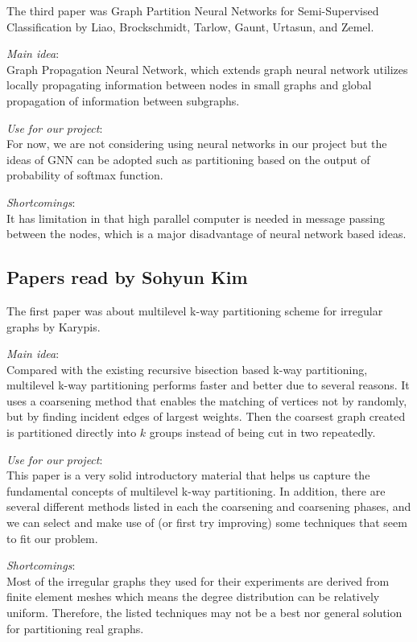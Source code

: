 The third paper was Graph Partition Neural Networks for Semi-Supervised Classification by Liao, Brockschmidt, Tarlow, Gaunt, Urtasun, and Zemel.
\cite{GPNN}
\begin{itemize*}
\item {\em Main idea}: \\
Graph Propagation Neural Network, which extends graph neural network utilizes locally propagating information between nodes in small graphs and global propagation of information between subgraphs.
\item {\em Use for our project}: \\
For now, we are not considering using neural networks in our project but the ideas of GNN can be adopted such as partitioning based on the output of probability of softmax function.
\item {\em Shortcomings}: \\
It has limitation in that high parallel computer is needed in message passing between the nodes, which is a major disadvantage of neural network based ideas. 

\end{itemize*}


\subsection{Papers read by Sohyun Kim}
The first paper was about multilevel k-way partitioning scheme for irregular graphs by Karypis.
\cite{k-way}
\begin{itemize*}
\item {\em Main idea}:\\
Compared with the existing recursive bisection based k-way partitioning, multilevel k-way partitioning performs faster and better due to several reasons. It uses a coarsening method that enables the matching of vertices not by randomly, but by finding incident edges of largest weights. Then the coarsest graph created is partitioned directly into $k$ groups instead of being cut in two repeatedly.
\item {\em Use for our project}:\\
This paper is a very solid introductory material that helps us capture the fundamental concepts of multilevel k-way partitioning. In addition, there are several different methods listed in each the coarsening and coarsening phases, and we can select and make use of (or first try improving) some techniques that seem to fit our problem.
\item {\em Shortcomings}:\\
Most of the irregular graphs they used for their experiments are derived from finite element meshes which means the degree distribution can be relatively uniform. Therefore, the listed techniques may not be a best nor general solution for partitioning real graphs.
\end{itemize*}

